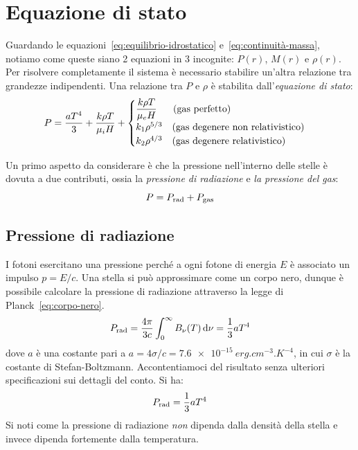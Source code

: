 \section{Equazione di stato}\label{sec:equazione-stato}
Guardando le equazioni~\eqref{eq:equilibrio-idrostatico} e~\eqref{eq:continuità-massa}, notiamo come queste siano 2 equazioni in 3 incognite: $P(r)$, $M(r)$ e $\rho(r)$. Per risolvere completamente il sistema è necessario stabilire un'altra relazione tra grandezze indipendenti. Una relazione tra $P$ e $\rho$ è stabilita dall'\emph{equazione di stato}:
\begin{equation}\label{eq:equazione-stato}
    P = \dfrac{aT^4}{3} + \dfrac{k \rho T}{\mu_i H} + 
    \begin{cases} 
    \dfrac{k \rho T}{\mu_e H} \quad \, \, \, \,   \textup{(gas perfetto)} \\ 
    k_1 \rho^{5/3} \quad \textup{(gas degenere non relativistico)} \\ 
    k_2 \rho^{4/3} \quad \textup{(gas degenere relativistico)}
    \end{cases}
\end{equation}

Un primo aspetto da considerare è che la pressione nell'interno delle stelle è dovuta a due contributi, ossia la \emph{pressione di radiazione} e \emph{la pressione del gas}:
\[
P = P_\textup{rad} + P_\textup{gas}
\]
\subsection{Pressione di radiazione}
I fotoni esercitano una pressione perché a ogni fotone di energia $E$ è associato un impulso $p = E / c$. Una stella si può approssimare come un corpo nero, dunque è possibile calcolare la pressione di radiazione attraverso la legge di Planck~\eqref{eq:corpo-nero}.
\[
P_\textup{rad} = \frac{4\pi}{3c}\int_0^\infty B_\nu(T) \mathop{\mathrm{{}d}}\mathopen{} \nu = \frac{1}{3} a T^4
\]
dove $a$ è una costante pari a $a = 4 \sigma / c = \SI{7.6e-15}{erg.cm^{-3}.K^{-4}}$, in cui $\sigma$ è la costante di Stefan-Boltzmann. Accontentiamoci del risultato senza ulteriori specificazioni sui dettagli del conto. Si ha:
\begin{equation}\label{eq:pressione-radiazione}
    P_\textup{rad} = \frac{1}{3} a T^4
\end{equation}
Si noti come la pressione di radiazione \emph{non} dipenda dalla densità della stella e invece dipenda fortemente dalla temperatura.

